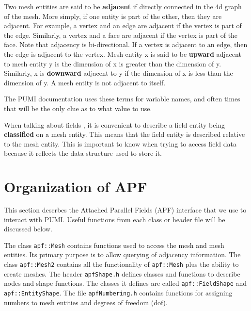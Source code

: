 \documentclass[12pt]{article}
\newcommand{\ttt}{\texttt}
\begin{document}
\FloatBarrier


Two mesh entities are said to be \textbf{adjacent} if directly connected in the 4d graph of the mesh.  More simply, if one entity is part of the other, then they are adjacent.  For example, a vertex and an edge are adjacent if the vertex is part of the edge.  Similarly, a vertex and a face are adjacent if the vertex is part of the face.  Note that adjacency is bi-directional.  If a vertex is adjacent to an edge, then the edge is adjacent to the vertex.  Mesh entity x is said to be \textbf{upward} adjacent to mesh entity y is the dimension of x is greater than the dimension of y.  Similarly, x is \textbf{downward} adjacent to y if the dimension of x is less than the dimension of y. A mesh entity is not adjacent to itself.

The PUMI documentation uses these terms for variable names, and often times that will be the only clue as to what value to use.

When talking about fields , it is convenient to describe a field entity being \textbf{classified} on a mesh entity.  This means that the field entity is described relative to the mesh entity.  This is important to know when trying to access field data because it reflects the data structure used to store it.

\section{Organization of APF}
This section descrbes the Attached Parallel Fields (APF) interface that we use to interact with PUMI.  Useful functions from each class or header file will be discussed below.

The class \ttt{apf::Mesh} contains functions used to access the mesh and mesh entities.  
Its primary purpose is to allow querying of adjacency information.  The class \ttt{apf::Mesh2} contains all the functionality of \ttt{apf::Mesh} plus the ability to create meshes.  
The header \ttt{apfShape.h} defines classes and functions to describe nodes and shape functions.  
The classes it defines are called \ttt{apf::FieldShape} and \ttt{apf::EntityShape}.
The file \ttt{apfNumbering.h} contains functions for assigning numbers to mesh entities and degrees of freedom (dof).
\end{document}

